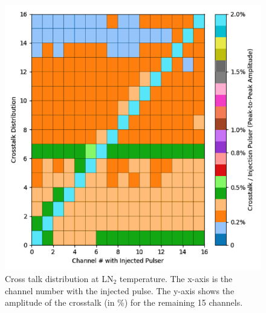\begin{figure}[h!]
\centering
  \includegraphics[width=0.7\linewidth]{figures/xtalk_LN2.png}
  \caption{Cross talk distribution at LN$_2$ temperature. The x-axis is the channel number with the injected pulse. The y-axis shows the amplitude of the crosstalk (in \%) for the remaining 15 channels.}
  \label{fig:xtalk_LN2}
\end{figure}

